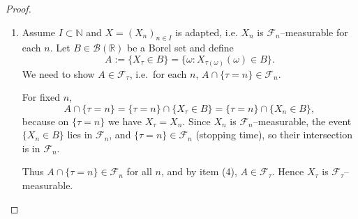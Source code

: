 \documentclass[11pt,a4paper]{article}
\theoremstyle{definition}
\begin{document}
\begin{proof}
\begin{enumerate}
\emph{Second inclusion: $\mathcal{G}_\tau \subset \mathcal{F}_\tau$.}
Let $A\in\mathcal{G}_\tau$. Fix $n\in I$. Then
\[
\{\tau\le n\} = \bigcup_{k\le n} \{\tau=k\},
\]
so
\[
A\cap\{\tau\le n\}
= \bigcup_{k\le n} \big(A\cap\{\tau=k\}\big).
\]
By assumption, $A\cap\{\tau=k\}\in\mathcal{F}_k\subset\mathcal{F}_n$
for each $k\le n$, and $\mathcal{F}_n$ is a $\sigma$--algebra, so the union
belongs to $\mathcal{F}_n$. Thus $A\in\mathcal{F}_\tau$, proving the equality.

\item Assume $I\subset\mathbb{N}$ and $X=(X_n)_{n\in I}$ is adapted, i.e.
$X_n$ is $\mathcal{F}_n$--measurable for each $n$.
Let $B\in\mathcal{B}(\mathbb{R})$ be a Borel set and define
\[
A := \{ X_\tau \in B \} = \{\omega : X_{\tau(\omega)}(\omega)\in B\}.
\]
We need to show $A\in\mathcal{F}_\tau$, i.e.\ for each $n$,
$A\cap\{\tau=n\}\in\mathcal{F}_n$.

For fixed $n$,
\[
A\cap\{\tau=n\}
= \{\tau=n\}\cap\{ X_\tau \in B \}
= \{\tau=n\}\cap\{ X_n \in B \},
\]
because on $\{\tau=n\}$ we have $X_\tau = X_n$.
Since $X_n$ is $\mathcal{F}_n$--measurable, the event $\{X_n\in B\}$
lies in $\mathcal{F}_n$, and $\{\tau=n\}\in\mathcal{F}_n$ (stopping time),
so their intersection is in $\mathcal{F}_n$.

Thus $A\cap\{\tau=n\}\in\mathcal{F}_n$ for all $n$, and by item (4),
$A\in\mathcal{F}_\tau$. Hence $X_\tau$ is $\mathcal{F}_\tau$--measurable.
    \end{enumerate}
\end{proof}
\end{document}
